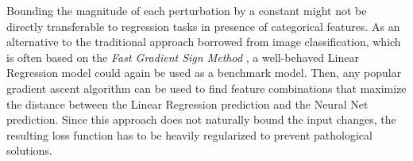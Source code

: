 Bounding the magnitude of each perturbation by a constant might not be directly transferable to regression tasks in presence of categorical features.
As an alternative to the traditional approach borrowed from image classification, which is often based on the \emph{Fast Gradient Sign Method} \citep{goodfellow2015}, a well-behaved Linear Regression model could again be used as a benchmark model.
Then, any popular gradient ascent algorithm can be used to find feature combinations that maximize the distance between the Linear Regression prediction and the Neural Net prediction.
Since this approach does not naturally bound the input changes, the resulting loss function has to be heavily regularized to prevent pathological solutions.


